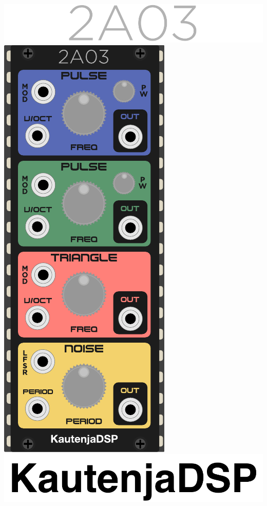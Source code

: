 \documentclass[12pt,a4paper]{article}
\begin{document}

\thispagestyle{empty}
\vspace*{\fill}
\begin{center}
\includegraphics{2A03-Logo}
\linebreak\linebreak\linebreak\linebreak
\includegraphics{2A03-Module}
\linebreak\linebreak\linebreak\linebreak
\includegraphics{KautenjaDSP}
\end{center}
\vspace*{\fill}
\clearpage
\end{document}
